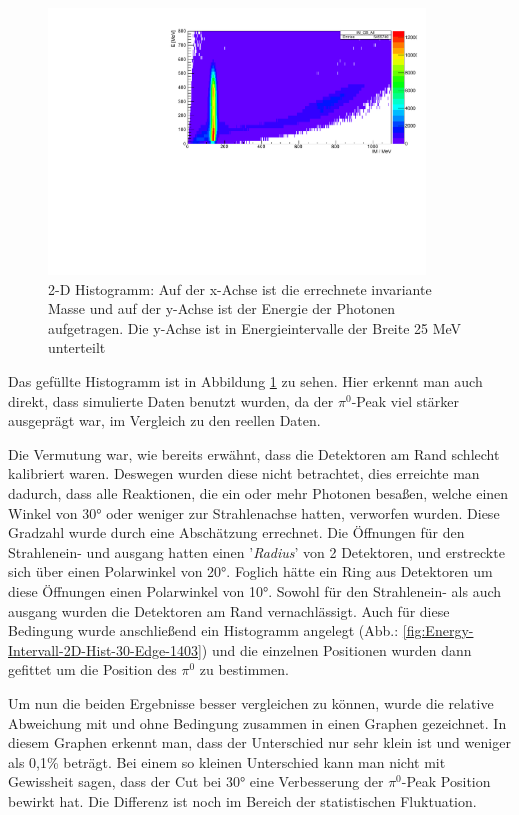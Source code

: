 \documentclass[a4paper,11pt,oneside,final,german,openbib,pdftex]{scrbook}
\begin{document}
\begin{figure}[h!]
	\begin{center}
		\includegraphics[width=100mm]{EnergyAngle2DHistoNoEdgePi0Position1403}
		\caption{2-D Histogramm: Auf der x-Achse ist die errechnete invariante Masse und auf der y-Achse ist der Energie der Photonen aufgetragen. Die y-Achse ist in Energieintervalle der Breite 25 MeV unterteilt}
		\label{fig:2D-Hist-Angle-Energy-Position-Pi0}
	\end{center}
\end{figure}

Das gef\"ullte Histogramm ist in Abbildung \ref{fig:2D-Hist-Angle-Energy-Position-Pi0} zu sehen. Hier erkennt man auch direkt, dass simulierte Daten benutzt wurden, da der $\pi^0$-Peak viel st\"arker ausgepr\"agt war, im Vergleich zu den reellen Daten.

Die Vermutung war, wie bereits erw\"ahnt, dass die Detektoren am Rand schlecht kalibriert waren. Deswegen wurden diese nicht betrachtet, dies erreichte man dadurch, dass alle Reaktionen, die ein oder mehr Photonen besa{\ss}en, welche einen Winkel von 30° oder weniger zur Strahlenachse hatten, verworfen wurden. Diese Gradzahl wurde durch eine Absch\"atzung errechnet. Die \"Offnungen f\"ur den Strahlenein- und ausgang hatten einen '\textit{Radius}' von 2 Detektoren, und erstreckte sich \"uber einen Polarwinkel von 20°. Foglich h\"atte ein Ring aus Detektoren um diese \"Offnungen einen Polarwinkel von 10°. Sowohl f\"ur den Strahlenein- als auch ausgang wurden die Detektoren am Rand vernachl\"assigt. 
Auch f\"ur diese Bedingung wurde anschlie{\ss}end ein Histogramm angelegt (Abb.: \ref{fig:Energy-Intervall-2D-Hist-30-Edge-1403}) und die einzelnen Positionen wurden dann gefittet um die Position des $\pi^0$ zu bestimmen.

Um nun die beiden Ergebnisse besser vergleichen zu k\"onnen, wurde die relative Abweichung mit und ohne Bedingung zusammen in einen Graphen gezeichnet. In diesem Graphen erkennt man, dass der Unterschied nur sehr klein ist und weniger als 0,1\% betr\"agt. Bei einem so kleinen Unterschied kann man nicht mit Gewissheit sagen, dass der Cut bei 30° eine Verbesserung der $\pi^0$-Peak Position bewirkt hat. Die Differenz ist noch im Bereich der statistischen Fluktuation. 
\end{document}

